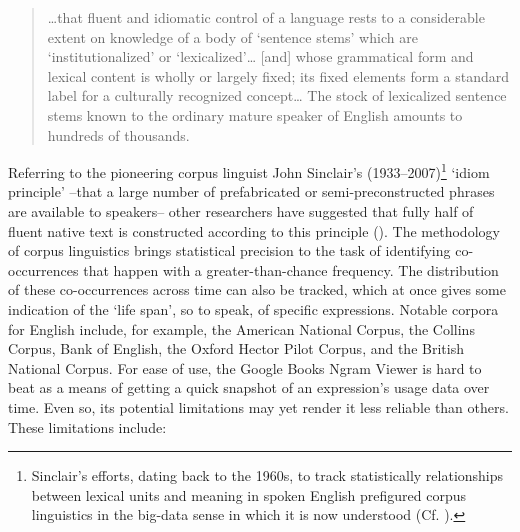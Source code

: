 \documentclass[output=paper]{langsci/langscibook}
\begin{document}
\begin{quote}
…that fluent and idiomatic control of a language rests to a considerable extent on knowledge of a body of ‘sentence stems’ which are ‘institutionalized’ or ‘lexicalized’… [and] whose grammatical form and lexical content is wholly or largely fixed; its fixed elements form a standard label for a culturally recognized concept… The stock of lexicalized sentence stems known to the ordinary mature speaker of English amounts to hundreds of thousands.  
\end{quote}

Referring to the pioneering corpus linguist John Sinclair’s (1933--2007)\footnote{ \textrm{Sinclair’s efforts, dating back to the 1960s, to track statistically relationships between lexical units and meaning in spoken English prefigured corpus linguistics in the big-data sense in which it is now understood (Cf. \citealt{chapelle_encyclopedia_2013-1}).}} ‘idiom principle’ –that a large number of prefabricated or semi-preconstructed phrases are available to speakers– other researchers have suggested that fully half of fluent native text is constructed according to this principle (\citealt[29]{erman_idiom_2000}). The methodology of corpus linguistics brings statistical precision to the task of identifying co-occurrences that happen with a greater-than-chance frequency.  The distribution of these co-occurrences across time can also be tracked, which at once gives some indication of the ‘life span’, so to speak, of specific expressions. Notable corpora for English include, for example, the American National Corpus, the Collins Corpus, Bank of English, the Oxford Hector Pilot Corpus, and the British National Corpus. For ease of use, the Google Books Ngram Viewer is hard to beat as a means of getting a quick snapshot of an expression’s usage data over time.  Even so, its potential limitations may yet render it less reliable than others. These limitations include: 
\end{document}
